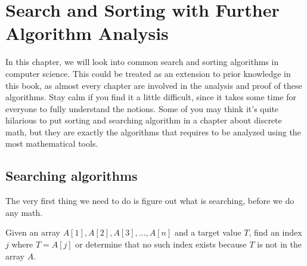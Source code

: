 \chapterspaceabove{6.75cm} 
\chapterspacebelow{7.25cm} 
\chapter{Search and Sorting with Further Algorithm Analysis}
In this chapter, we will look into common search and sorting algorithms in computer science. This could
be treated as an extension to prior knowledge in this book, as almost every chapter are involved in the
analysis and proof of these algorithms. Stay calm if you find it a little difficult, since it takes some
time for everyone to fully understand the notions. Some of you may think it's quite hilarious to put 
sorting and searching algorithm in a chapter about discrete math, but they are exactly the algorithms that
requires to be analyzed using the most mathematical tools.

\section{Searching algorithms}
    The very first thing we need to do is figure out what is searching, before we do any math.
    \begin{definition}
        Given an array \( A[1], A[2], A[3], \ldots, A[n] \) and a target value \( T \), find an index \( j \) where \( T = A[j] \) or determine that no such index exists because \( T \) is not in the array \( A \).
    \end{definition}
